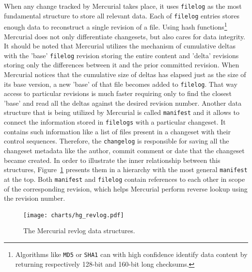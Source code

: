 When any change tracked by Mercurial takes place, it uses \texttt{filelog} as the most fundamental structure to store all relevant data. Each of \texttt{filelog} entries stores enough data to reconstruct a single revision of a file. Using hash functions\footnote{Algorithms like \texttt{MD5} or \texttt{SHA1} can with high confidence identify data content by returning respectively 128-bit and 160-bit long checksums.} Mercurial does not only differentiate changesets, but also cares for data integrity. It should be noted that Mercurial utilizes the mechanism of cumulative deltas with the 'base' \texttt{filelog} revision storing the entire content and 'delta' revisions storing only the differences between it and the prior committed revision. When Mercurial notices that the cumulative size of deltas has elapsed just as the size of its base version, a new 'base' of that file becomes added to \texttt{filelog}. That way access to particular revisions is much faster requiring only to find the closest 'base' and read all the deltas against the desired revision number. Another data structure that is being utilized by Mercurial is called \texttt{manifest} and it allows to connect the information stored in \texttt{filelogs} with a particular changeset. It contains such information like a list of files present in a changeset with their control sequences. Therefore, the \texttt{changelog} is responsible for saving all the changeset metadata like the author, commit comment or date that the changeset became created. In order to illustrate the inner relationship between this structures, Figure~\ref{fig:hg_revlog} presents them in a hierarchy with the most general \texttt{manifest} at the top. Both \texttt{manifest} and \texttt{filelog} contain references to each other in scope of the corresponding revision, which helps Mercurial perform reverse lookup using the revision number.
\begin{figure}[ht]
\begin{center}
\texttt{[image: charts/hg\_revlog.pdf]}
\caption{The Mercurial revlog data structures.}
\label{fig:hg_revlog}
\end{center}
\end{figure}
